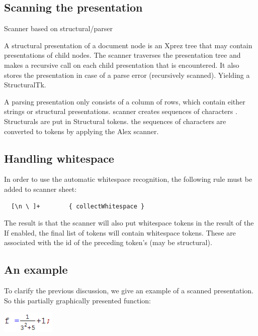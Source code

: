 \documentclass[12pt]{article}
\begin{document}
\subsection{Scanning the presentation}

Scanner based on structural/parser



\noindent A structural presentation of a document node is an Xprez tree that may contain presentations of child nodes. The scanner traverses the presentation tree and makes a recursive call on each child presentation that is encountered. It also stores the presentation in case of a parse error (recursively scanned). Yielding a StructuralTk.


\noindent A parsing presentation only consists of a column of rows, which contain either strings or structural presentations. scanner creates sequences of characters . Structurals are put in Structural tokens. the sequences of characters are converted to tokens by applying the Alex scanner.


\subsection{Handling whitespace}

In order to use the automatic whitespace recognition, the following rule must be added to scanner sheet:

\begin{footnotesize}
\begin{verbatim}
  [\n \ ]+        { collectWhitespace }
\end{verbatim} %
\end{footnotesize}

The result is that the scanner will also put whitespace tokens in the result of the If enabled, the final list of tokens will contain whitespace tokens. These are associated with the id of the preceding token's (may be structural).


\subsection{An example}

To clarify the previous discussion, we give an example of a scanned presentation. So this partially graphically presented function:
\begin{center}
\includegraphics[width=1in]{images/fraction}
\end{center}
\end{document}
